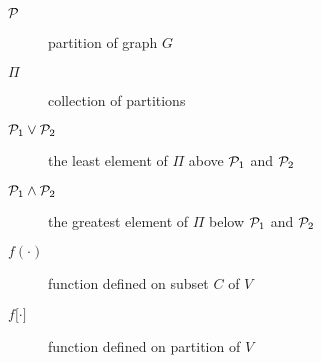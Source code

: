 \begin{description}
\item[$\P$] partition of graph $G$
\item[$\Pi$] collection of partitions
\item[$\P_1 \vee \P_2$] the least element of $\Pi$ above $\P_1$ and $\P_2$
\item[$\P_1 \wedge \P_2$] the greatest element of $\Pi$ below $\P_1$ and $\P_2$
\item[$f(\cdot)$] function defined on subset $C$ of $V$
\item[$f{[}\cdot{]}$] function defined on partition of $V$
\end{description}